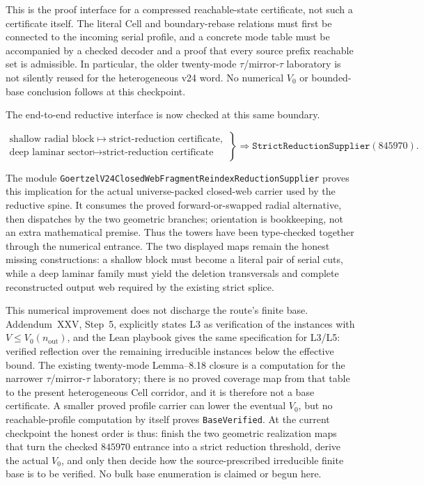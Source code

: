 \documentclass[11pt]{article}
\theoremstyle{definition}
\begin{document}
This is the proof interface for a compressed reachable-state certificate, not
such a certificate itself.  The literal Cell and boundary-rebase relations
must first be connected to the incoming serial profile, and a concrete mode
table must be accompanied by a checked decoder and a proof that every source
prefix reachable set is admissible.  In particular, the older twenty-mode
$\tau$/mirror-$\tau$ laboratory is not silently reused for the heterogeneous
v24 word.  No numerical $V_0$ or bounded-base conclusion follows at this
checkpoint.

The end-to-end reductive interface is now checked at this same boundary.

\[
  \left.
  \begin{array}{c}
  \text{shallow radial block}\longmapsto\text{strict-reduction certificate},\\
  \text{deep laminar sector}\longmapsto\text{strict-reduction certificate}
  \end{array}
  \right\}
  \Longrightarrow
  \texttt{StrictReductionSupplier}(845970).
\]

The module
\texttt{GoertzelV24ClosedWebFragmentReindexReductionSupplier} proves this
implication for the actual universe-packed closed-web carrier used by the
reductive spine.  It consumes the proved forward-or-swapped radial alternative,
then dispatches by the two geometric branches; orientation is bookkeeping, not
an extra mathematical premise.  Thus the towers have been type-checked
together through the numerical entrance.  The two displayed maps remain the
honest missing constructions: a shallow block must become a literal pair of
serial cuts, while a deep laminar family must yield the deletion transversals
and complete reconstructed output web required by the existing strict splice.

This numerical improvement does not discharge the route's finite base.
Addendum~XXV, Step~5, explicitly states L3 as verification of the instances
with $V\leq V_0(n_{\mathrm{out}})$, and the Lean playbook gives the same
specification for L3/L5: verified reflection over the remaining irreducible
instances below the effective bound.  The existing twenty-mode
Lemma--8.18 closure is a computation for the narrower
$\tau$/mirror-$\tau$ laboratory; there is no proved coverage map from that
table to the present heterogeneous Cell corridor, and it is therefore not a
base certificate.  A smaller proved profile carrier can lower the eventual
$V_0$, but no reachable-profile computation by itself proves
\texttt{BaseVerified}.  At the current checkpoint the honest order is thus:
finish the two geometric realization maps that turn the checked $845970$
entrance into a strict reduction threshold, derive the actual $V_0$, and only
then decide how the source-prescribed irreducible finite base is to be
verified.  No bulk base enumeration is claimed or begun here.
\end{document}
